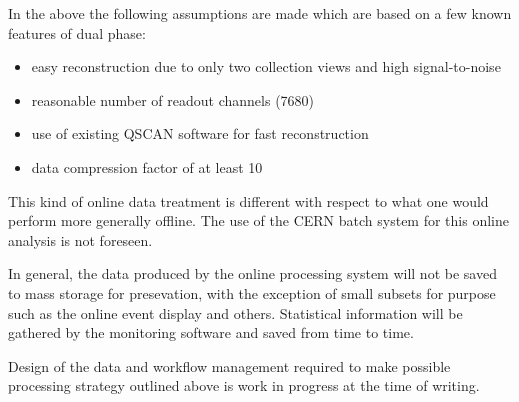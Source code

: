 \documentclass[pdftex,12pt,letter]{article}
\begin{document}
In the above the following assumptions are made which are based on a few known features of dual phase:
\begin{itemize}
\item easy reconstruction due to only two collection views and high signal-to-noise
\item reasonable number of readout channels (7680)
\item use of existing QSCAN software for fast reconstruction
\item data compression factor of at least 10
\end{itemize}

\noindent This kind of online data treatment is  different with respect to what one would perform
more generally offline. The use of the CERN batch system for this online analysis is not foreseen.

In general, the data produced by the online processing system will not be saved to mass storage for presevation, with
the exception of small subsets for purpose such as the online event display and others. Statistical information will be gathered by
the monitoring software and saved from time to time.

Design of the data and workflow management required to make possible processing strategy outlined above is work in progress
at the time of writing.
\end{document}
